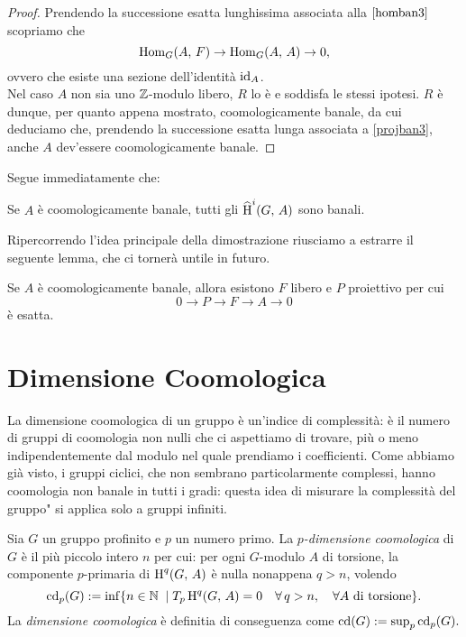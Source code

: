 \begin{proof}
	Prendendo la successione esatta lunghissima associata alla $ \ref{homban3} $ scopriamo che
	\[ \operatorname{Hom}_G(A, \, F) \to \operatorname{Hom}_G(A, \, A) \to 0, \]
	ovvero che esiste una sezione dell'identità $ \operatorname{id}_A $.\\
	
	Nel caso $ A $ non sia uno $ \mathbb{Z} $-modulo libero, $ R $ lo è e soddisfa le stessi ipotesi. $ R $ è dunque, per quanto appena mostrato, coomologicamente banale, da cui deduciamo che, prendendo la successione esatta lunga associata a \ref{projban3}, anche $ A $ dev'essere coomologicamente banale.
	
\end{proof}

Segue immediatamente che:

\begin{corollary}
	Se $ A $ è coomologicamente banale, tutti gli $ \operatorname{\widehat{H}}^i(G, \, A) $ sono banali.
\end{corollary}

Ripercorrendo l'idea principale della dimostrazione riusciamo a estrarre il seguente lemma, che ci tornerà untile in futuro.

\begin{corollary}
	Se $ A $ è coomologicamente banale, allora esistono $ F $ libero e $ P $ proiettivo per cui
	\[ 0 \to P \to F \to A \to 0 \]
	è esatta.
\end{corollary}

\section{Dimensione Coomologica}
La dimensione coomologica di un gruppo è un'indice di complessità: è il numero di gruppi di coomologia non nulli che ci aspettiamo di trovare, più o meno indipendentemente dal modulo nel quale prendiamo i coefficienti. Come abbiamo già visto, i gruppi ciclici, che non sembrano particolarmente complessi, hanno coomologia non banale in tutti i gradi: questa idea di \leftquote misurare la complessità del gruppo" si applica solo a gruppi infiniti.

\begin{definition}
	Sia $ G $ un gruppo profinito e $ p $ un numero primo. La \emph{$ p $-dimensione coomologica} di $ G $ è il più piccolo intero $ n $ per cui: per ogni $ G $-modulo $ A $ di torsione, la componente $ p $-primaria di $ \operatorname{H}^q(G, \, A) $ è nulla nonappena $ q > n $, volendo
	\[ \operatorname{cd}_p(G) := \inf \{ n \in \mathbb{N} \; \mid T_p\operatorname{H}^q(G, \, A)=0\quad \forall \, q > n, \quad \forall A \text{ di torsione} \}. \]
	La \emph{dimensione coomologica} è definitia di conseguenza come $ \operatorname{cd}(G) := \sup_p \operatorname{cd}_p(G). $
\end{definition}


